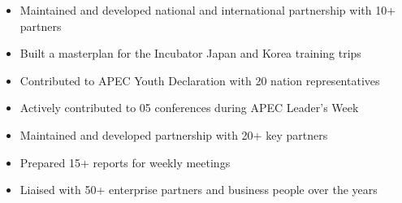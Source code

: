 \documentclass[10pt,a4paper,ragged2e]{altacv}
\begin{document}
\divider

\begin{itemize}
	\item Maintained and developed national and international partnership with 10+ partners
	\item Built a masterplan for the Incubator Japan and Korea training trips 
\end{itemize}

\begin{itemize}
	\item Contributed to APEC Youth Declaration with 20 nation representatives
	\item Actively contributed to 05 conferences during APEC Leader's Week
\end{itemize}

\divider

\begin{itemize}
	\item Maintained and developed partnership with 20+ key partners
	\item Prepared 15+ reports for weekly meetings
	\item Liaised with 50+ enterprise partners and business people over the years
\end{itemize}
\end{document}
